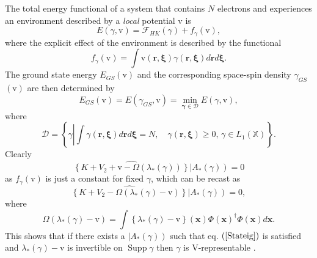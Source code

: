 \documentclass[aps,preprint]{revtex4}%
\begin{document}
The total energy functional of a system that contains $N$ electrons and
experiences an environment described by a \emph{local} potential $\mathrm{v}$
is
\begin{equation}
E\left(  \gamma\mathbf{,}\mathrm{v}\right)  =\mathcal{F}_{HK}\left(
\gamma\right)  +f_{\gamma}\left(  \mathrm{v}\right)  ,
\end{equation}
where the explicit effect of the environment is described by the functional
\begin{equation}
f_{\gamma}\left(  \mathrm{v}\right)  =\int\mathrm{v}\left(  \mathbf{r,\xi
}\right)  \gamma\left(  \mathbf{r,\xi}\right)  d\mathbf{r}d\mathbf{\xi.}%
\end{equation}
The ground state energy $E_{GS}\left(  \mathrm{v}\right)  $ and the
corresponding space-spin density $\gamma_{GS}$ $\left(  \mathrm{v}\right)  $
are then determined by
\begin{equation}
E_{GS}\left(  \mathrm{v}\right)  =E\left(  \gamma_{GS}\mathbf{,}%
\mathrm{v}\right)  =\min_{\mathbf{\gamma\in}\mathcal{D}}E\left(
\gamma\mathbf{,}\mathrm{v}\right)  ,
\end{equation}
where
\begin{equation}
\mathcal{D}=\left\{  \gamma\left\vert \int\gamma\left(  \mathbf{r,\xi}\right)
d\mathbf{r}d\mathbf{\xi}=N,\quad\gamma\left(  \mathbf{r,\xi}\right)
\geq0,\,\gamma\in L_{1}\left(  \mathbb{X}\right)  \right.  \right\}  .
\end{equation}
Clearly
\begin{equation}
\widehat{\left\{  K+V_{2}+\mathrm{v}-\Omega\left(  \lambda_{\ast}\left(
\gamma\right)  \right)  \right\}  }\left\vert A_{\ast}\left(  \gamma\right)
\right)  =0 \label{vstat}%
\end{equation}
as $f_{\gamma}\left(  \mathrm{v}\right)  $ is just a constant for fixed
$\gamma$, which can be recast as
\begin{equation}
\widehat{\left\{  K+V_{2}-\Omega\left(  \lambda_{\ast}\left(  \gamma\right)
-\mathrm{v}\right)  \right\}  }\left\vert A_{\ast}\left(  \gamma\right)
\right)  =0,
\end{equation}
where
\begin{equation}
\Omega\left(  \lambda_{\ast}\left(  \gamma\right)  -\mathrm{v}\right)
=\int\left\{  \lambda_{\ast}\left(  \gamma\right)  -\mathrm{v}\right\}
\left(  \mathbf{x}\right)  \Phi\left(  \mathbf{x}\right)  ^{\dagger}%
\Phi\left(  \mathbf{x}\right)  d\mathbf{x.}%
\end{equation}
This shows that if there exists a $\left\vert A_{\ast}\left(  \gamma\right)
\right)  $ such that eq. $\left(  \ref{Stateig}\right)  $ is satisfied and
$\lambda_{\ast}\left(  \gamma\right)  -\mathrm{v}$ is invertible on
$\operatorname{Supp}\gamma$ then $\gamma$ is V-representable \cite{weiner2005}.
\end{document}
